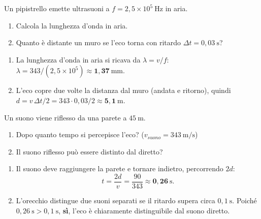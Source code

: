 \begin{question}[ID=2.1, subtitle={Ecolocalizzazione del pipistrello}, tags={onde, eco, ultrasuoni}, difficulty=facile]
Un pipistrello emette ultrasuoni a $f = 2{,}5\times10^5\ \mathrm{Hz}$ in aria.
\begin{enumerate}
\item Calcola la lunghezza d'onda in aria.
\item Quanto è distante un muro se l'eco torna con ritardo $\Delta t = 0{,}03\ \mathrm{s}$?
\end{enumerate}
\begin{solution}
\begin{enumerate}
\item La lunghezza d'onda in aria si ricava da $\lambda = v/f$: $\lambda = 343/(2{,}5\times10^5) \approx \mathbf{1{,}37\ \mathrm{mm}}$.
\item L'eco copre due volte la distanza dal muro (andata e ritorno), quindi $d = v\,\Delta t/2 = 343\cdot 0{,}03/2 \approx \mathbf{5{,}1\ \mathrm{m}}$.
\end{enumerate}
\end{solution}
\end{question}

\begin{question}[ID=2.2, subtitle={Eco in teatro da parete a 45 m}, tags={eco, suono, riflessione}, difficulty=facile]
Un suono viene riflesso da una parete a $45\ \mathrm{m}$.
\begin{enumerate}
\item Dopo quanto tempo si percepisce l'eco? ($v_{suono} = 343\ \mathrm{m/s}$)
\item Il suono riflesso può essere distinto dal diretto?
\end{enumerate}
\begin{solution}
\begin{enumerate}
\item Il suono deve raggiungere la parete e tornare indietro, percorrendo $2d$:
\[
t = \frac{2d}{v} = \frac{90}{343} \approx \mathbf{0{,}26\ \mathrm{s}}.
\]
\item L'orecchio distingue due suoni separati se il ritardo supera circa $0{,}1\ \mathrm{s}$. Poiché $0{,}26\ \mathrm{s} > 0{,}1\ \mathrm{s}$, \textbf{sì}, l'eco è chiaramente distinguibile dal suono diretto.
\end{enumerate}
\end{solution}
\end{question}

